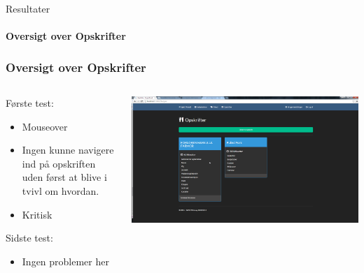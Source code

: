 \begin{frame}{Resultater}
\framesubtitle{Oversigt over Opskrifter}
	\subsubsection{Oversigt over Opskrifter}
	
	\begin{minipage}[0.3\textheight]{\textwidth}
	\begin{columns}[T]
	\begin{column}{0.5\textwidth}
	
	Første test:
	\begin{itemize}
	\item Mouseover
	\item Ingen kunne navigere ind på opskriften uden først at blive i tvivl om hvordan.
	\item Kritisk
	
	\end{itemize}
	Sidste test:
	\begin{itemize}
		\item Ingen problemer her
	\end{itemize}
	
	\end{column}
	\begin{column}{0.5\textwidth}
	 \includegraphics[width=1\textwidth,height=1\textheight,keepaspectratio, trim={1cm 0 0 16mm}, clip]{images/Screenshots/RecipeOld.png}
	 
	 \vspace{2 mm}
	  

\end{column}
\end{columns}
\end{minipage}
\end{frame}
